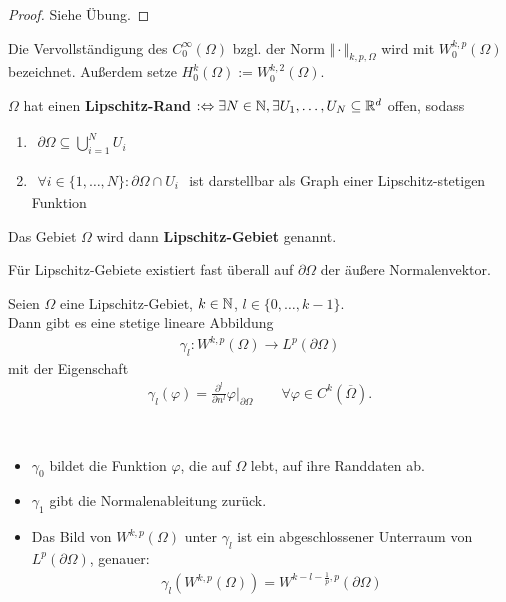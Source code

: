 \begin{proof}
	Siehe Übung.
\end{proof}

\begin{definition}
	Die Vervollständigung des $C_0^\infty(\Omega)$ bzgl. der Norm $\Vert\cdot\Vert_{k,p,\Omega}$ wird mit $W_0^{k,p}(\Omega)$ bezeichnet.
	Außerdem setze $H_0^k(\Omega):=W_0^{k,2}(\Omega)$.
\end{definition}

\begin{definition}\enter
	$\Omega$ hat einen \textbf{Lipschitz-Rand} $:\Leftrightarrow\exists N\in\mathbb{N},\exists U_1,\ldots,U_N\subseteq\mathbb{R}^d$ offen, sodass
	\begin{enumerate}
		\item $\begin{aligned}
			\partial\Omega\subseteq\bigcup\limits^N_{i=1} U_i
		\end{aligned}$
		\item $\begin{aligned}
			\forall i\in\lbrace1,\ldots,N\rbrace:\partial\Omega\cap U_i
		\end{aligned}$
		ist darstellbar als Graph einer Lipschitz-stetigen Funktion
	\end{enumerate}
	Das Gebiet $\Omega$ wird dann \textbf{Lipschitz-Gebiet} genannt.
\end{definition}

\begin{bemerkung}
	Für Lipschitz-Gebiete existiert fast überall auf $\partial\Omega$ der äußere Normalenvektor.
\end{bemerkung}

\begin{satz}[Spursatz]\label{satz1.7Spursatz}\enter
	Seien $\Omega$ eine Lipschitz-Gebiet, $k\in\mathbb{N}$, $l\in\lbrace 0,\ldots,k-1\rbrace$.\\
	Dann gibt es eine stetige lineare Abbildung
	\begin{align*}
		\gamma_l:W^{k,p}(\Omega)\rightarrow L^p(\partial\Omega)
	\end{align*}
	mit der Eigenschaft
	\begin{align*}
		\gamma_l(\varphi)=\frac{\partial^l}{\partial n^l}\varphi|_{\partial\Omega}\qquad\forall\varphi\in C^k(\overline{\Omega}).
	\end{align*}
\end{satz}

\begin{bemerkung}\
	\begin{itemize}
		\item $\gamma_0$ bildet die Funktion $\varphi$, die auf $\Omega$ lebt, auf ihre Randdaten ab.
		\item  $\gamma_1$ gibt die Normalenableitung zurück.
		\item Das Bild von $W^{k,p}(\Omega)$ unter $\gamma_l$ ist ein abgeschlossener Unterraum von $L^p(\partial\Omega)$, genauer:
		\begin{align*}
			\gamma_l\left(W^{k,p}(\Omega)\right)=W^{k-l-\frac{1}{p},p}(\partial\Omega)
		\end{align*}
	\end{itemize}
\end{bemerkung}

